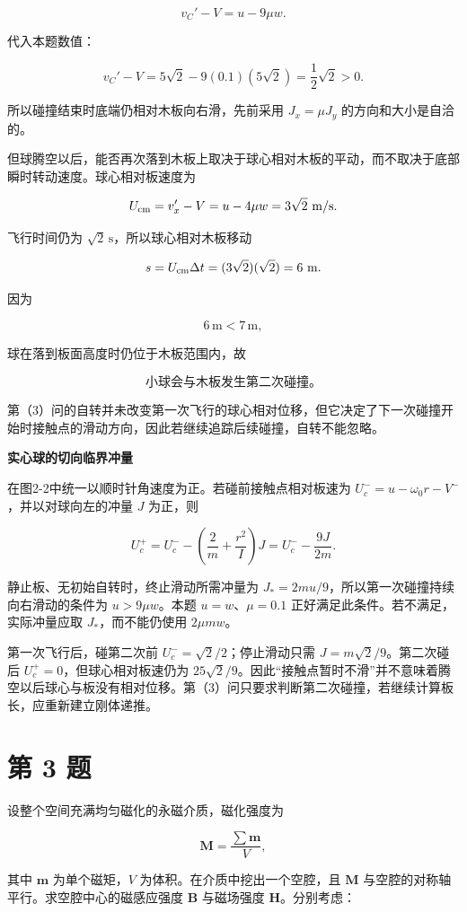 \documentclass[12pt,a4paper,UTF8]{ctexart}
\begin{document}
\[v_C'-V=u-9\mu w.\]

代入本题数值：

\[v_C'-V=5\sqrt2-9(0.1)(5\sqrt2)=\frac12\sqrt2>0.\]

所以碰撞结束时底端仍相对木板向右滑，先前采用 \(J_x=\mu J_y\)
的方向和大小是自洽的。

但球腾空以后，能否再次落到木板上取决于球心相对木板的平动，而不取决于底部瞬时转动速度。球心相对板速度为

\[U_{\rm cm}=v_x'-V=u-4\mu w=3\sqrt2\ \mathrm{m/s}.\]

飞行时间仍为 \(\sqrt2\,\mathrm s\)，所以球心相对木板移动

\[s=U_{\rm cm}\Delta t=(3\sqrt2)(\sqrt2)=6\ \mathrm m.\]

因为

\[6\,\mathrm m<7\,\mathrm m,\]

球在落到板面高度时仍位于木板范围内，故

\[\boxed{\text{小球会与木板发生第二次碰撞。}}\]

第（3）问的自转并未改变第一次飞行的球心相对位移，但它决定了下一次碰撞开始时接触点的滑动方向，因此若继续追踪后续碰撞，自转不能忽略。

\textbf{实心球的切向临界冲量}

在图2-2中统一以顺时针角速度为正。若碰前接触点相对板速为
\(U_c^-=u-\omega_0r-V^-\)，并以对球向左的冲量 \(J\) 为正，则

\[U_c^+=U_c^- -\left(\frac2m+\frac{r^2}{I}\right)J
=U_c^- -\frac{9J}{2m}.\]

静止板、无初始自转时，终止滑动所需冲量为
\(J_*=2mu/9\)，所以第一次碰撞持续向右滑动的条件为 \(u>9\mu w\)。本题
\(u=w\)、\(\mu=0.1\) 正好满足此条件。若不满足，实际冲量应取
\(J_*\)，而不能仍使用 \(2\mu mw\)。

第一次飞行后，碰第二次前 \(U_c^-=\sqrt2/2\)；停止滑动只需
\(J=m\sqrt2/9\)。第二次碰后 \(U_c^+=0\)，但球心相对板速仍为
\(25\sqrt2/9\)。因此``接触点暂时不滑''并不意味着腾空以后球心与板没有相对位移。第（3）问只要求判断第二次碰撞，若继续计算板长，应重新建立刚体递推。

\newpage

\section{第 3 题}\label{ux7b2c-3-ux9898}

设整个空间充满均匀磁化的永磁介质，磁化强度为

\[\bm M=\frac{\sum \bm m}{V},\]

其中 \(\bm m\) 为单个磁矩，\(V\) 为体积。在介质中挖出一个空腔，且
\(\bm M\) 与空腔的对称轴平行。求空腔中心的磁感应强度 \(\bm B\)
与磁场强度 \(\bm H\)。分别考虑：
\end{document}
